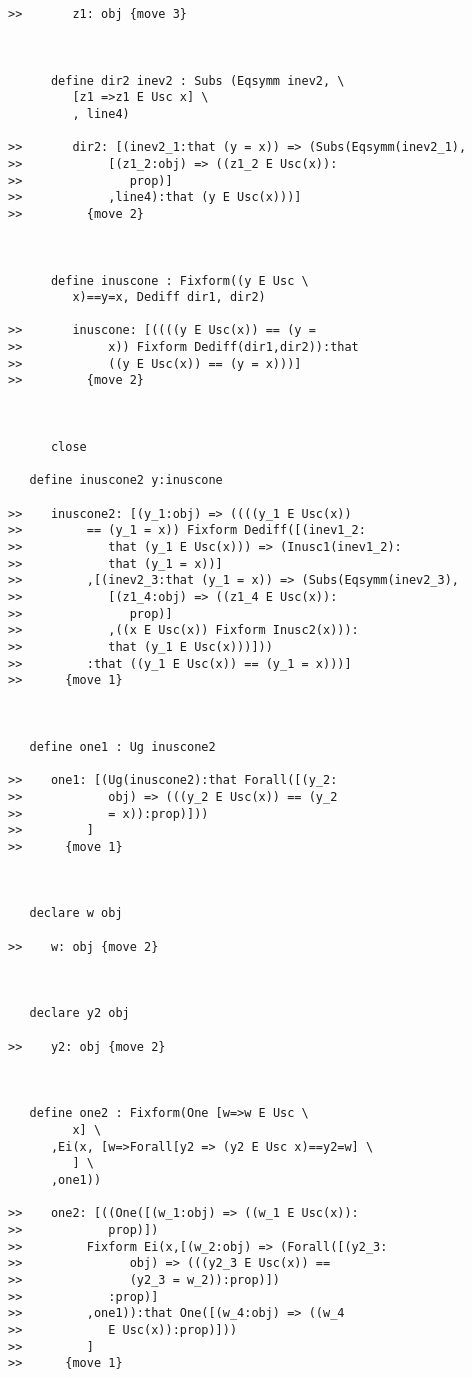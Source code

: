 \documentclass[12pt]{article}
\begin{document}
\begin{verbatim}
>>       z1: obj {move 3}



      define dir2 inev2 : Subs (Eqsymm inev2, \
         [z1 =>z1 E Usc x] \
         , line4)

>>       dir2: [(inev2_1:that (y = x)) => (Subs(Eqsymm(inev2_1),
>>            [(z1_2:obj) => ((z1_2 E Usc(x)):
>>               prop)]
>>            ,line4):that (y E Usc(x)))]
>>         {move 2}



      define inuscone : Fixform((y E Usc \
         x)==y=x, Dediff dir1, dir2)

>>       inuscone: [((((y E Usc(x)) == (y =
>>            x)) Fixform Dediff(dir1,dir2)):that
>>            ((y E Usc(x)) == (y = x)))]
>>         {move 2}



      close

   define inuscone2 y:inuscone

>>    inuscone2: [(y_1:obj) => ((((y_1 E Usc(x))
>>         == (y_1 = x)) Fixform Dediff([(inev1_2:
>>            that (y_1 E Usc(x))) => (Inusc1(inev1_2):
>>            that (y_1 = x))]
>>         ,[(inev2_3:that (y_1 = x)) => (Subs(Eqsymm(inev2_3),
>>            [(z1_4:obj) => ((z1_4 E Usc(x)):
>>               prop)]
>>            ,((x E Usc(x)) Fixform Inusc2(x))):
>>            that (y_1 E Usc(x)))]))
>>         :that ((y_1 E Usc(x)) == (y_1 = x)))]
>>      {move 1}



   define one1 : Ug inuscone2

>>    one1: [(Ug(inuscone2):that Forall([(y_2:
>>            obj) => (((y_2 E Usc(x)) == (y_2
>>            = x)):prop)]))
>>         ]
>>      {move 1}



   declare w obj

>>    w: obj {move 2}



   declare y2 obj

>>    y2: obj {move 2}



   define one2 : Fixform(One [w=>w E Usc \
         x] \
      ,Ei(x, [w=>Forall[y2 => (y2 E Usc x)==y2=w] \
         ] \
      ,one1))

>>    one2: [((One([(w_1:obj) => ((w_1 E Usc(x)):
>>            prop)])
>>         Fixform Ei(x,[(w_2:obj) => (Forall([(y2_3:
>>               obj) => (((y2_3 E Usc(x)) ==
>>               (y2_3 = w_2)):prop)])
>>            :prop)]
>>         ,one1)):that One([(w_4:obj) => ((w_4
>>            E Usc(x)):prop)]))
>>         ]
>>      {move 1}




\end{verbatim}
\end{document}
